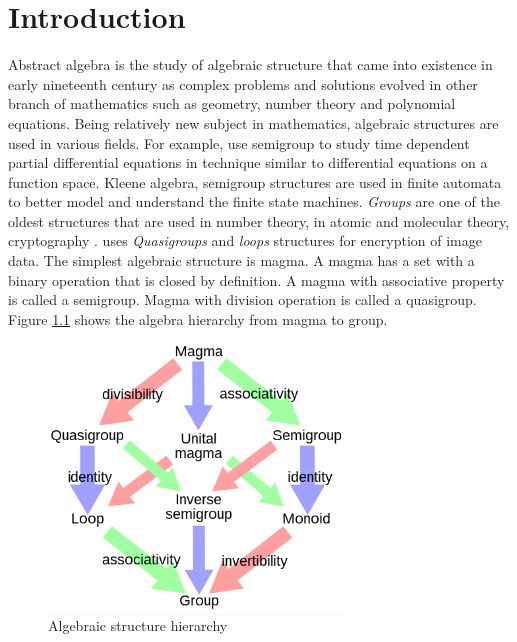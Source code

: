 \chapter{Introduction}
Abstract algebra is the study of algebraic structure that came into existence in
early nineteenth century as complex problems and solutions evolved in other
branch of mathematics such as geometry, number theory and polynomial equations.
Being relatively new subject in mathematics, algebraic structures are used in
various fields. For example, \cite{liaqat2021some} use semigroup  to study time dependent partial differential
equations in technique similar to differential equations on a function space.
Kleene algebra, semigroup structures are used in finite automata to better model
and understand the finite state machines. \textit{Groups} are one of the oldest
structures that are used in number theory, in atomic and molecular theory,
cryptography \cite{enwiki:1133598242}. \cite{bruck1944some} uses
\textit{Quasigroups} and \textit{loops} structures for encryption of image data.
The simplest algebraic structure is magma. A magma has a set with a binary
operation that is closed by definition. A magma with associative property is
called a semigroup. Magma with division operation is called a quasigroup. Figure
\ref{fig_magma} shows the algebra hierarchy from magma to group. 
 \begin{figure}[ht]
	\centering
	\includegraphics[width=0.7\textwidth]{figures/Sample/Magma_to_group.jpg}
	\caption{Algebraic structure hierarchy \cite{enwiki:1107380309}}
	\label{fig_magma}
 \end{figure}

